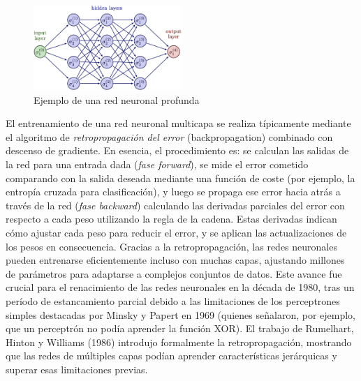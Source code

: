 \documentclass[11pt,spanish,listoffigures,listoftables]{tfgetsinf}
\begin{document}
\begin{figure}[htbp]
    \centering
    \includegraphics[width=0.5\textwidth]{neural_network.jpg}
    \caption{Ejemplo de una red neuronal profunda \cite{neural_network}}
    \label{fig:neural_network}
\end{figure}


El entrenamiento de una red neuronal multicapa se realiza típicamente mediante el algoritmo de \textit{retropropagación del error} (backpropagation) combinado con 
descenso de gradiente. En esencia, el procedimiento es: se calculan las salidas de la red para una entrada dada (\textit{fase forward}), se mide el error cometido 
comparando con la salida deseada mediante una función de coste (por ejemplo, la entropía cruzada para clasificación), y luego se propaga ese error hacia atrás a 
través de la red (\textit{fase backward}) calculando las derivadas parciales del error con respecto a cada peso utilizando la regla de la cadena. Estas derivadas 
indican cómo ajustar cada peso para reducir el error, y se aplican las actualizaciones de los pesos en consecuencia. Gracias a la retropropagación, las redes neuronales 
pueden entrenarse eficientemente incluso con muchas capas, ajustando millones de parámetros para adaptarse a complejos conjuntos de datos. Este avance fue crucial para 
el renacimiento de las redes neuronales en la década de 1980, tras un período de estancamiento parcial debido a las limitaciones de los perceptrones simples destacadas 
por Minsky y Papert en 1969 (quienes señalaron, por ejemplo, que un perceptrón no podía aprender la función XOR). El trabajo de Rumelhart, Hinton y Williams (1986) 
introdujo formalmente la retropropagación, mostrando que las redes de múltiples capas podían aprender características jerárquicas y superar esas limitaciones previas.
\end{document}
